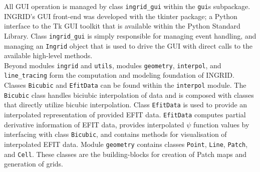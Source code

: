 All GUI operation is managed by class \texttt{ingrid\_gui} within the \texttt{gui}s subpackage. INGRID's GUI front-end was developed with the tkinter package; a Python interface to the Tk GUI toolkit that is available within the Python Standard Library. Class \texttt{ingrid\_gui} is simply responsible for managing event handling, and managing an \texttt{Ingrid} object that is used to drive the GUI with direct calls to the available high-level methods.\\ \indent
Beyond modules \texttt{ingrid} and \texttt{utils}, modules \texttt{geometry}, \texttt{interpol}, and \texttt{line\_tracing} form the computation and modeling foundation of INGRID. Classes \texttt{Bicubic} and \texttt{EfitData} can be found within the \texttt{interpol} module. The \texttt{Bicubic} class handles biciubic interpolation of data and is composed with classes that directly utilize bicubic interpolation. Class \texttt{EfitData} is used to provide an interpolated representation of provided EFIT data. \texttt{EfitData} computes partial derivative information of EFIT data, provides interpolated $\psi$ function values by interfacing with class \texttt{Bicubic}, and contains methods for visualisation of interpolated EFIT data. Module \texttt{geometry} contains classes \texttt{Point}, \texttt{Line}, \texttt{Patch}, and \texttt{Cell}. These classes are the building-blocks for creation of Patch maps and generation of grids.